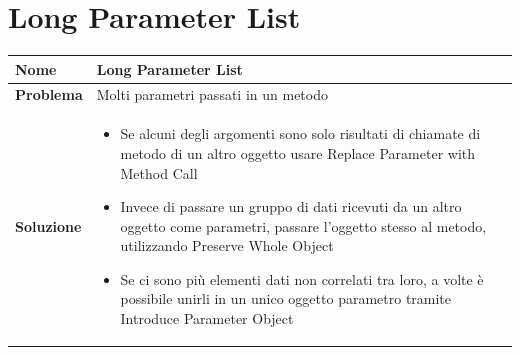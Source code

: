 \section{Long Parameter List}
\begin{table}[h]
    \centering
    \renewcommand{\arraystretch}{1.2} %
    \begin{tabularx}{\textwidth}{l X}
        \toprule
        \textbf{Nome} & Long Parameter List \\
        \midrule
        \textbf{Problema} & Molti parametri passati in un metodo \\
        \midrule
        \textbf{Soluzione} & 
        \begin{itemize}[leftmargin=*, nosep, after=\vspace{0.5em}]
           \item Se alcuni degli argomenti sono solo risultati di chiamate di metodo di un altro oggetto usare Replace Parameter with Method Call
           \item Invece di passare un gruppo di dati ricevuti da un altro oggetto come parametri, passare l'oggetto stesso al metodo, utilizzando Preserve Whole Object
           \item Se ci sono più elementi dati non correlati tra loro, a volte è possibile unirli in un unico oggetto parametro tramite Introduce Parameter Object
        \end{itemize}
        \\ %
        \bottomrule
    \end{tabularx}
\end{table}

